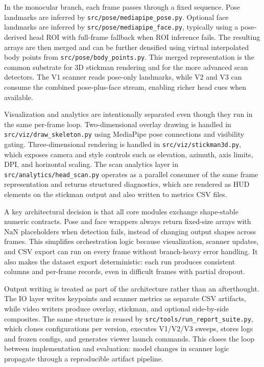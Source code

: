 \documentclass[11pt,a4paper]{article}
\begin{document}
In the monocular branch, each frame passes through a fixed sequence. Pose landmarks are inferred by \texttt{src/pose/mediapipe\_pose.py}. Optional face landmarks are inferred by \texttt{src/pose/mediapipe\_face.py}, typically using a pose-derived head ROI with full-frame fallback when ROI inference fails. The resulting arrays are then merged and can be further densified using virtual interpolated body points from \texttt{src/pose/body\_points.py}. This merged representation is the common substrate for 3D stickman rendering and for the more advanced scan detectors. The V1 scanner reads pose-only landmarks, while V2 and V3 can consume the combined pose-plus-face stream, enabling richer head cues when available.

Visualization and analytics are intentionally separated even though they run in the same per-frame loop. Two-dimensional overlay drawing is handled in \texttt{src/viz/draw\_skeleton.py} using MediaPipe pose connections and visibility gating. Three-dimensional rendering is handled in \texttt{src/viz/stickman3d.py}, which exposes camera and style controls such as elevation, azimuth, axis limits, DPI, and horizontal scaling. The scan analytics layer in \texttt{src/analytics/head\_scan.py} operates as a parallel consumer of the same frame representation and returns structured diagnostics, which are rendered as HUD elements on the stickman output and also written to metrics CSV files.

A key architectural decision is that all core modules exchange shape-stable numeric contracts. Pose and face wrappers always return fixed-size arrays with \(\mathrm{NaN}\) placeholders when detection fails, instead of changing output shapes across frames. This simplifies orchestration logic because visualization, scanner updates, and CSV export can run on every frame without branch-heavy error handling. It also makes the dataset export deterministic: each run produces consistent columns and per-frame records, even in difficult frames with partial dropout.

Output writing is treated as part of the architecture rather than an afterthought. The IO layer writes keypoints and scanner metrics as separate CSV artifacts, while video writers produce overlay, stickman, and optional side-by-side composites. The same structure is reused by \texttt{src/tools/run\_report\_suite.py}, which clones configurations per version, executes V1/V2/V3 sweeps, stores logs and frozen configs, and generates viewer launch commands. This closes the loop between implementation and evaluation: model changes in scanner logic propagate through a reproducible artifact pipeline.
\end{document}
